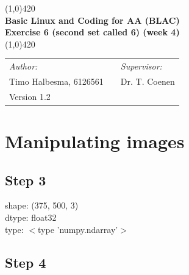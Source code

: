 \documentclass[a4paper]{article}
\begin{document}
\begin{center}
\line(1,0){420} \\
\huge \textbf{Basic Linux and Coding for AA (BLAC) \\ Exercise 6 (second set called 6) (week 4)} \\
\line(1,0){420}
\end{center}

\vfill



\begin{table}[h]
\begin{center}
\begin{tabular}{lp{5cm}l}
\textit{Author:} & & \emph{Supervisor:} \\
Timo Halbesma, 6126561 & & Dr. T. Coenen\\
Version 1.2 & & \\
\end{tabular}
\end{center}
\end{table}


\newpage
\section*{Manipulating images}
\subsection*{Step 3}
shape:  (375, 500, 3) \\
dtype:  float32  \\
type:  $<$type 'numpy.ndarray'$>$

\subsection*{Step 4}

\end{document}

